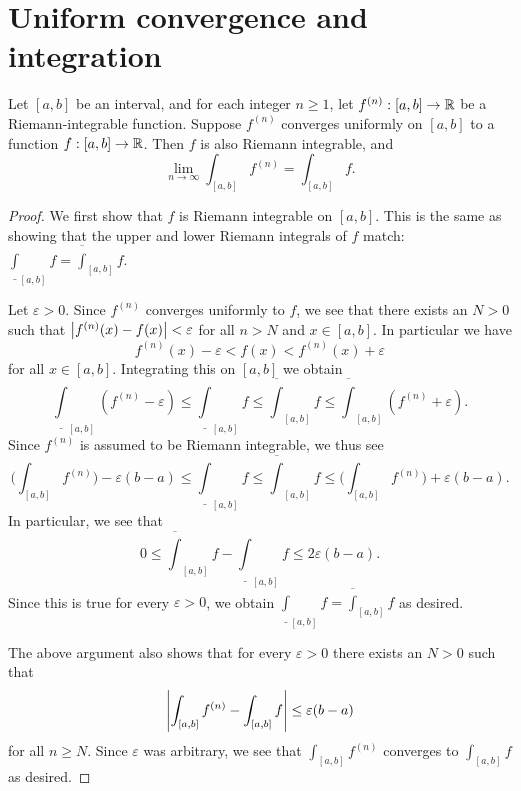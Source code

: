\section{Uniform convergence and integration}\label{ii:sec:3.6}

\begin{thm}\label{ii:3.6.1}
  Let \([a, b]\) be an interval, and for each integer \(n \geq 1\), let \(f^{(n)} : [a, b] \to \mathbb{R}\) be a Riemann-integrable function.
  Suppose \(f^{(n)}\) converges uniformly on \([a, b]\) to a function \(f : [a, b] \to \mathbb{R}\).
  Then \(f\) is also Riemann integrable, and
  \[
    \lim_{n \to \infty} \int_{[a, b]} f^{(n)} = \int_{[a, b]} f.
  \]
\end{thm}

\begin{proof}
  We first show that \(f\) is Riemann integrable on \([a, b]\).
  This is the same as showing that the upper and lower Riemann integrals of \(f\) match:
  \(\underline{\int}_{[a, b]} f = \overline{\int}_{[a, b]} f\).

  Let \(\varepsilon > 0\).
  Since \(f^{(n)}\) converges uniformly to \(f\), we see that there exists an \(N > 0\) such that \(\left\lvert f^{(n)}(x) - f(x)\right\rvert < \varepsilon\) for all \(n > N\) and \(x \in [a, b]\).
  In particular we have
  \[
    f^{(n)}(x) - \varepsilon < f(x) < f^{(n)}(x) + \varepsilon
  \]
  for all \(x \in [a, b]\).
  Integrating this on \([a, b]\) we obtain
  \[
    \underline{\int}_{[a, b]} (f^{(n)} - \varepsilon) \leq \underline{\int}_{[a, b]} f \leq \overline{\int}_{[a, b]} f \leq \overline{\int}_{[a, b]} (f^{(n)} + \varepsilon).
  \]
  Since \(f^{(n)}\) is assumed to be Riemann integrable, we thus see
  \[
    \Bigg(\int_{[a, b]} f^{(n)}\Bigg) - \varepsilon (b - a) \leq \underline{\int}_{[a, b]} f \leq \overline{\int}_{[a, b]} f \leq \Bigg(\int_{[a, b]} f^{(n)}\Bigg) + \varepsilon (b - a).
  \]
  In particular, we see that
  \[
    0 \leq \overline{\int}_{[a, b]} f - \underline{\int}_{[a, b]} f \leq 2 \varepsilon (b - a).
  \]
  Since this is true for every \(\varepsilon > 0\), we obtain \(\underline{\int}_{[a, b]} f = \overline{\int}_{[a, b]} f\) as desired.

  The above argument also shows that for every \(\varepsilon > 0\) there exists an \(N > 0\) such that
  \[
    \left\lvert\int_{[a, b]} f^{(n)} - \int_{[a, b]} f\right\rvert \leq \varepsilon (b - a)
  \]
  for all \(n \geq N\).
  Since \(\varepsilon\) was arbitrary, we see that \(\int_{[a, b]} f^{(n)}\) converges to \(\int_{[a, b]} f\) as desired.
\end{proof}

